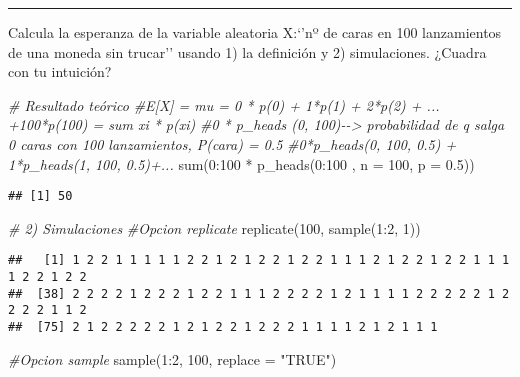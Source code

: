 \documentclass[
]{article}
\newenvironment{Shaded}{\begin{snugshade}}{\end{snugshade}}
\newcommand{\AttributeTok}[1]{\textcolor[rgb]{0.77,0.63,0.00}{#1}}
\newcommand{\CommentTok}[1]{\textcolor[rgb]{0.56,0.35,0.01}{\textit{#1}}}
\newcommand{\DecValTok}[1]{\textcolor[rgb]{0.00,0.00,0.81}{#1}}
\newcommand{\FloatTok}[1]{\textcolor[rgb]{0.00,0.00,0.81}{#1}}
\newcommand{\FunctionTok}[1]{\textcolor[rgb]{0.00,0.00,0.00}{#1}}
\newcommand{\NormalTok}[1]{#1}
\newcommand{\SpecialCharTok}[1]{\textcolor[rgb]{0.00,0.00,0.00}{#1}}
\newcommand{\StringTok}[1]{\textcolor[rgb]{0.31,0.60,0.02}{#1}}
\begin{document}
\begin{center}\rule{0.5\linewidth}{0.5pt}\end{center}

Calcula la esperanza de la variable aleatoria X:`'nº de caras en 100
lanzamientos de una moneda sin trucar'' usando 1) la definición y 2)
simulaciones. ¿Cuadra con tu intuición?

\begin{Shaded}
\begin{Highlighting}[]
\CommentTok{\# Resultado teórico}
  \CommentTok{\#E[X] = mu = 0 * p(0) + 1*p(1) + 2*p(2) + ... +100*p(100) = sum xi * p(xi)}
  \CommentTok{\#0 * p\_heads (0, 100){-}{-}\textgreater{}  probabilidad de q salga 0 caras con 100 lanzamientos, P(cara) = 0.5}
  \CommentTok{\#0*p\_heads(0, 100, 0.5) + 1*p\_heads(1, 100, 0.5)+...}
   \FunctionTok{sum}\NormalTok{(}\DecValTok{0}\SpecialCharTok{:}\DecValTok{100} \SpecialCharTok{*} \FunctionTok{p\_heads}\NormalTok{(}\DecValTok{0}\SpecialCharTok{:}\DecValTok{100}\NormalTok{ , }\AttributeTok{n =} \DecValTok{100}\NormalTok{, }\AttributeTok{p =} \FloatTok{0.5}\NormalTok{))}
\end{Highlighting}
\end{Shaded}

\begin{verbatim}
## [1] 50
\end{verbatim}

\begin{Shaded}
\begin{Highlighting}[]
\CommentTok{\# 2) Simulaciones }
    \CommentTok{\#Opcion replicate}
    \FunctionTok{replicate}\NormalTok{(}\DecValTok{100}\NormalTok{, }\FunctionTok{sample}\NormalTok{(}\DecValTok{1}\SpecialCharTok{:}\DecValTok{2}\NormalTok{, }\DecValTok{1}\NormalTok{)) }
\end{Highlighting}
\end{Shaded}

\begin{verbatim}
##   [1] 1 2 2 1 1 1 1 1 2 2 1 2 1 2 2 1 2 2 1 1 1 2 1 2 2 1 2 2 1 1 1 1 2 2 1 2 2
##  [38] 2 2 2 2 1 2 2 2 1 2 2 1 1 1 2 2 2 2 1 2 1 1 1 1 2 2 2 2 2 1 2 2 2 2 1 1 2
##  [75] 2 1 2 2 2 2 2 1 2 1 2 2 1 2 2 2 1 1 1 1 2 1 2 1 1 1
\end{verbatim}

\begin{Shaded}
\begin{Highlighting}[]
    \CommentTok{\#Opcion sample}
    \FunctionTok{sample}\NormalTok{(}\DecValTok{1}\SpecialCharTok{:}\DecValTok{2}\NormalTok{, }\DecValTok{100}\NormalTok{, }\AttributeTok{replace =} \StringTok{"TRUE"}\NormalTok{)}
\end{Highlighting}
\end{Shaded}
\end{document}
